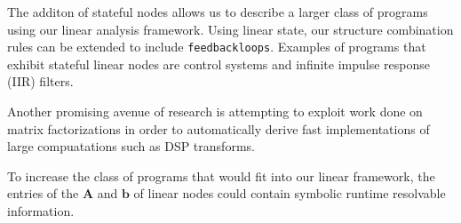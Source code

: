 The additon of stateful nodes allows us to describe a larger class of programs 
using our linear analysis framework.
Using linear state, our structure combination rules can be extended to include {\tt feedbackloops}.
Examples of programs that exhibit stateful linear nodes are control systems
and infinite impulse response (IIR) filters.

Another promising avenue of research is attempting to exploit work done
on matrix factorizations in order to automatically derive fast implementations of 
large compuatations such as DSP transforms.

To increase the class of programs that would fit into our linear framework, 
the entries of the ${\mathbf A}$ and ${\mathbf b}$ of linear nodes could contain symbolic
runtime resolvable information.

